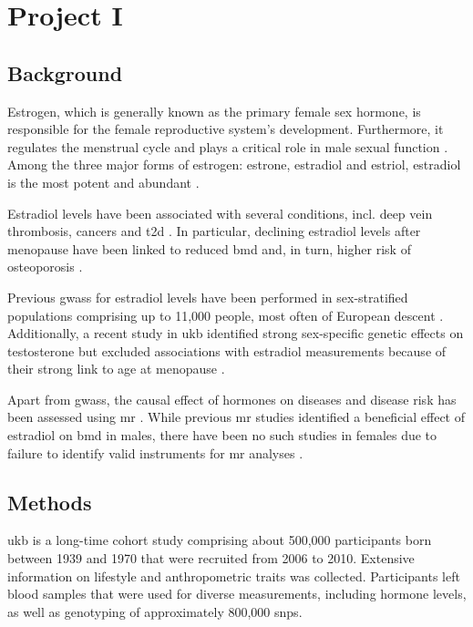 \documentclass[draft]{scrbook}
\begin{document}
\chapter{Project I}

\section{Background}
Estrogen, which is generally known as the primary female sex hormone, is responsible for the female reproductive system's development.
Furthermore, it regulates the menstrual cycle and plays a critical role in male sexual function \cite{Bates2013b,Hess1997b}. 
Among the three major forms of estrogen: estrone, estradiol and estriol, estradiol is the most potent and abundant \cite{Thomas2013c}.

Estradiol levels have been associated with several conditions, incl. deep vein thrombosis, cancers and \gls{t2d} \cite{Cauley1999a, Rosendaal2003b,Vikan2010}.
In particular, declining estradiol levels after menopause have been linked to reduced \gls{bmd} and, in turn, higher risk of osteoporosis \cite{Riggs1998a,Longo2012a}.

Previous \glspl{gwas} for estradiol levels have been performed in sex-stratified populations comprising up to 11,000 people, most often of European descent \cite{Pott2019e,Chen2013d,Liu2013b,Prescott2012f,Eriksson2018b}.
Additionally, a recent study in \gls{ukb} identified strong sex-specific genetic effects on testosterone but excluded associations with estradiol measurements because of their strong link to age at menopause \cite{Ruth2020d}.

Apart from \glspl{gwas}, the causal effect of hormones on diseases and disease risk has been assessed using \gls{mr} \cite{Eriksson2018b,Ruth2020d, Nethander2018a}.
While previous \gls{mr} studies identified a beneficial effect of estradiol on \gls{bmd} in males, there have been no such studies in females due to failure to identify valid instruments for \gls{mr} analyses \cite{Eriksson2018b, Nethander2018a}.

\section{Methods} \label{p1methods}
\Gls{ukb} is a long-time cohort study comprising about 500,000 participants born between 1939 and 1970 that were recruited from 2006 to 2010.
Extensive information on lifestyle and anthropometric traits was collected.
Participants left blood samples that were used for diverse measurements, including hormone levels, as well as genotyping of approximately 800,000 \glspl{snp}.
\end{document}
